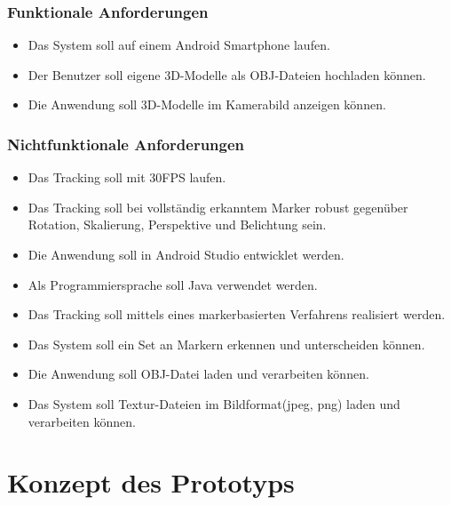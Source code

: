 \subsubsection{Funktionale Anforderungen}
\begin{itemize}
\item Das System soll auf einem Android Smartphone laufen.
\item Der Benutzer soll eigene 3D-Modelle als OBJ-Dateien hochladen können.
\item Die Anwendung soll 3D-Modelle im Kamerabild anzeigen können.




\end{itemize}

\subsubsection{Nichtfunktionale Anforderungen}
\begin{itemize}
\item Das Tracking soll mit 30FPS laufen.
\item Das Tracking soll bei vollständig erkanntem Marker robust gegenüber Rotation, Skalierung, Perspektive und Belichtung sein.

\item Die Anwendung soll in Android Studio entwicklet werden.
\item Als Programmiersprache soll Java verwendet werden.

\item Das Tracking soll mittels eines markerbasierten Verfahrens realisiert werden.
\item Das System soll ein Set an Markern erkennen und unterscheiden können.

\item Die Anwendung soll OBJ-Datei laden und verarbeiten können.
\item Das System soll Textur-Dateien im Bildformat(jpeg, png) laden und verarbeiten können.





\end{itemize}
\section{Konzept des Prototyps}




